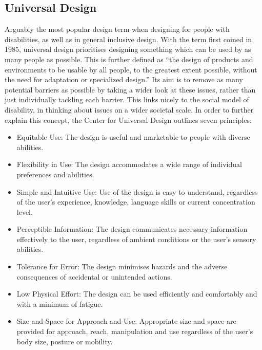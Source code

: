 \documentclass{l4proj}
\begin{document}
\subsection{Universal Design}
Arguably the most popular design term when designing for people with disabilities, as well as in general inclusive design. With the term first coined in 1985, universal design prioritises designing something which can be used by as many people as possible. This is further defined as “the design of products and environments to be usable by all people, to the greatest extent possible, without the need for adaptation or specialized design.” \cite{Cen1997} 
Its aim is to remove as many potential barriers as possible by taking a wider look at these issues, rather than just individually tackling each barrier. This links nicely to the social model of disability, in thinking about issues on a wider societal scale. 
In order to further explain this concept, the Center for Universal Design outlines seven principles: 
\begin{itemize}
    \item 
Equitable Use: The design is useful and marketable to people with diverse abilities. 
\item
Flexibility in Use: The design accommodates a wide range of individual preferences and abilities. 
\item
Simple and Intuitive Use: Use of the design is easy to understand, regardless of the user’s experience, knowledge, language skills or current concentration level. 
\item
Perceptible Information: The design communicates necessary information effectively to the user, regardless of ambient conditions or the user’s sensory abilities. 
\item
Tolerance for Error: The design minimises hazards and the adverse consequences of accidental or unintended actions. 
\item
Low Physical Effort: The design can be used efficiently and comfortably and with a minimum of fatigue. 
\item
Size and Space for Approach and Use: Appropriate size and space are provided for approach, reach, manipulation and use regardless of the user’s body size, posture or mobility.
\end{itemize}
\end{document}
